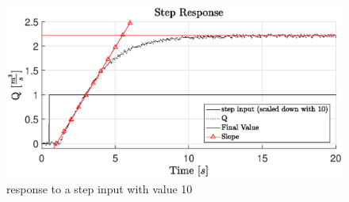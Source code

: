 \begin{figure}[H]
    \centering
    \includegraphics[width=\textwidth]{figures/04ExperimentsAndLabWork/UnitStepResponse1Pump.eps}
    \caption{response to a step input with value 10}
	\label{fig:stepin}
\end{figure}
\\ \\ \\ \\
